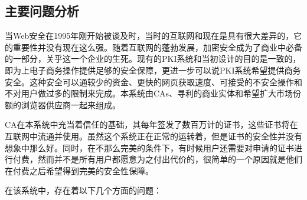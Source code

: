 \subsection{主要问题分析}

当Web安全在1995年刚开始被谈及时，当时的互联网和现在是具有很大差异的，它的重要性并没有现在这么强。随着互联网的蓬勃发展，加密安全成为了商业中必备的一部分，关乎这一个企业的生死。现有的PKI系统和当初设计的目的是一致的，即为上电子商务操作提供足够的安全保障，更进一步可以说PKI系统希望提供商务安全。这种安全可以通较少的资金、更快的网页获取速度、可接受的不安全操作和不对用户做过多的限制来完成。本系统由CAs、寻利的商业实体和希望扩大市场份额的浏览器供应商一起来组成。

CA在本系统中充当着信任的基础，其每年签发了数百万计的证书，这些证书将在互联网中流通并使用。虽然这个系统正在正常的运转着，但是证书的安全性并没有想象中那么好。同时，在不那么完美的条件下，有时候用户还需要对申请的证书进行付费，然而并不是所有用户都愿意为之付出代价的，很简单的一个原因就是他们在付费之后希望得到完美的安全性保障。

在该系统中，存在着以下几个方面的问题\cite{ristic2014bulletproof}：


